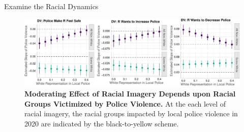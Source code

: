 \documentclass[
  10pt,
  ignorenonframetext,
]{beamer}
\begin{document}
\begin{frame}{Examine the Racial Dynamics}
\protect\hypertarget{examine-the-racial-dynamics}{}
\begin{figure}

{\centering \includegraphics{slides_files/figure-beamer/fig-racial-component-1.pdf}

}

\caption{\label{fig-racial-component}\textbf{Moderating Effect of Racial
Imagery Depends upon Racial Groups Victimized by Police Violence.} At
the each level of racial imagery, the racial groups impacted by local
police violence in 2020 are indicated by the black-to-yellow scheme.}

\end{figure}
\end{frame}
\end{document}
